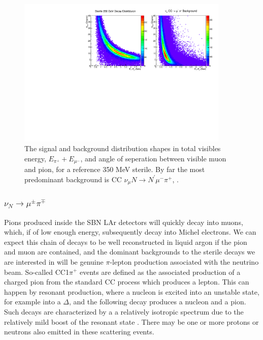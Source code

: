 \documentclass[11pt, a4paper]{article}
\begin{document}
\begin{figure}[h]
\center
\includegraphics[width=0.9\textwidth,clip,trim=0 0 0 0]{figures/mu_pi_dist.pdf}
\caption{\label{fig:mu_pi_dist} The signal and background distribution shapes in total visibles energy,  $E_{\pi^+}+E_{\mu^-}$, and angle of seperation between visible muon and pion, for a reference 350 MeV sterile. By far the most predominant background is CC $\nu_\mu N \rightarrow N^\prime \mu^- \pi^+$, . }

\end{figure}


\subsubsection{$\nu_N \rightarrow \mu^\pm \pi^\mp$ }

Pions produced inside the SBN LAr detectors will quickly decay into muons,
which, if of low enough energy, subsequently decay into Michel electrons. We
can expect this chain of decays to be well reconstructed in liquid argon if the
pion and muon are contained, and the dominant backgrounds to the sterile decays
we are interested in will be genuine $\pi$-lepton production associated with
the neutrino beam. So-called CC1$\pi^+$ events are defined as the associated
production of a charged pion from the standard CC process which produces a
lepton. This can happen by resonant production, where a nucleon is excited into
an unstable state, for example into a $\Delta$, and the following decay
produces a nucleon and a pion. Such decays are characterized by a a relatively
isotropic spectrum due to the relatively mild boost of the resonant state
\cite{Rein:1982pf}. There may be one or more protons or neutrons also emitted
in these scattering events. 
\end{document}
